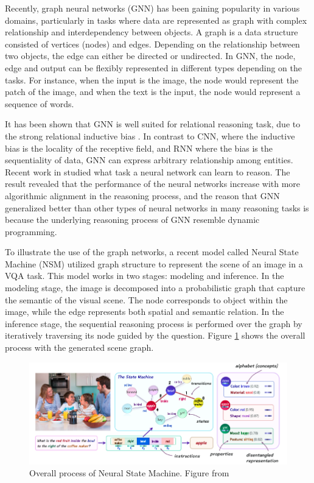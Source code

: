 \documentclass[journal]{IEEEtran}
\begin{document}
Recently, graph neural networks (GNN) has been gaining popularity in various domains, 
particularly in tasks where data are represented as graph with complex relationship and interdependency between objects.
A graph is a data structure consisted of vertices (nodes) and edges.
Depending on the relationship between two objects, the edge can either be directed or undirected. 
In GNN, the node, edge and output can be flexibly represented in different types depending on the tasks. 
For instance, when the input is the image, the node would represent the patch of the image, and
when the text is the input, the node would represent a sequence of words.

It has been shown that GNN is well suited for relational reasoning task, due to the strong relational inductive bias \cite{47094}.
In contrast to CNN, where the inductive bias is the locality of the receptive field, and RNN where the bias is the sequentiality of data,
GNN can express arbitrary relationship among entities. 
Recent work in \cite{xu2019can} studied what task a neural network can learn to reason. 
The result revealed that the performance of the neural networks increase with more algorithmic alignment in the reasoning process, 
and the reason that GNN generalized better than other types of neural networks in many reasoning tasks is because the underlying reasoning process of GNN resemble dynamic programming.

To illustrate the use of the graph networks, a recent model called Neural State Machine (NSM) \cite{hudson2019learning} utilized graph structure to represent the scene of an image in a VQA task.
This model works in two stages: modeling and inference. 
In the modeling stage, the image is decomposed into a probabilistic graph that capture the semantic of the visual scene.
The node corresponds to object within the image, while the edge represents both spatial and semantic relation.
In the inference stage, the sequential reasoning process is performed over the graph by iteratively traversing its node guided by the question.
Figure \ref{nsm} shows the overall process with the generated scene graph.

\begin{figure}[htb]
  \includegraphics[width=\linewidth]{NSM.png}
  \caption{Overall process of Neural State Machine. Figure from \cite{hudson2019learning}}
  \label{nsm}
\end{figure}
\end{document}
